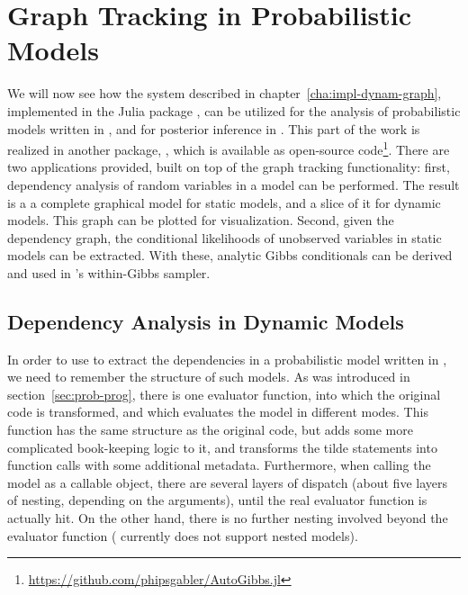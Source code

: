 \chapter{Graph Tracking in Probabilistic Models}
\label{cha:graph-track-prob}

We will now see how the system described in chapter~\ref{cha:impl-dynam-graph}, implemented in the
Julia package \irtrackerjl{}, can be utilized for the analysis of probabilistic models written in
\dppljl{}, and for posterior inference in \turingjl{}.  This part of the work is realized in another
package, \autogibbsjl{}, which is available as open-source
code\footnote{\url{https://github.com/phipsgabler/AutoGibbs.jl}}.  There are two applications
provided, built on top of the graph tracking functionality: first, dependency analysis of random
variables in a model can be performed.  The result is a a complete graphical model for static
models, and a slice of it for dynamic models.  This graph can be plotted for visualization.  Second,
given the dependency graph, the conditional likelihoods of unobserved variables in static models can
be extracted.  With these, analytic Gibbs conditionals can be derived and used in \turingjl{}'s
within-Gibbs sampler.

\section{Dependency Analysis in Dynamic Models}
\label{sec:dependency-analysis}

In order to use \irtrackerjl{} to extract the dependencies in a probabilistic model written in
\dppljl{}, we need to remember the structure of such models.  As was introduced in
section~\ref{sec:prob-prog}, there is one evaluator function, into which the original code is
transformed, and which evaluates the model in different modes.  This function has the same structure
as the original code, but adds some more complicated book-keeping logic to it, and transforms the
tilde statements into function calls with some additional metadata.  Furthermore, when calling the
model as a callable object, there are several layers of dispatch (about five layers of nesting,
depending on the arguments), until the real evaluator function is actually hit.  On the other hand,
there is no further nesting involved beyond the evaluator function (\turingjl{} currently does not
support nested models).

